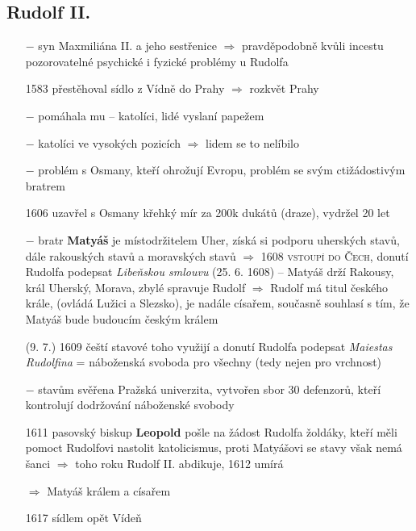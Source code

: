 \documentclass{article}
\begin{document}
\subsection*{Rudolf II.}
\begin{itemize}
    \vspace{-0.5em}
    \setlength\itemsep{0.15em}
    \item[$-$] syn Maxmiliána II. a jeho sestřenice $\Rightarrow$ pravděpodobně kvůli incestu pozorovatelné psychické i fyzické problémy u Rudolfa
    \item[1583] přestěhoval sídlo z Vídně do Prahy $\Rightarrow$ rozkvět Prahy
    \item[$-$] pomáhala mu  -- katolíci, lidé vyslaní papežem
    \item[$-$] katolíci ve vysokých pozicích $\Rightarrow$ lidem se to nelíbilo


    \item[$-$] problém s Osmany, kteří ohrožují Evropu, problém se svým ctižádostivým bratrem
    \item[1606] uzavřel s Osmany křehký mír za 200k dukátů (draze), vydržel 20 let
    \item[$-$] bratr \textbf{Matyáš} je místodržitelem Uher, získá si podporu uherských stavů, dále rakouských stavů a moravských stavů $\Rightarrow$ 1608 \textsc{vstoupí do Čech}, donutí Rudolfa podepsat \textit{Libeňskou smlouvu} (25. 6. 1608) -- Matyáš drží Rakousy, král Uherský, Morava, zbylé spravuje Rudolf $\Rightarrow$ Rudolf má titul českého krále, (ovládá Lužici a Slezsko), je nadále císařem, současně souhlasí s tím, že Matyáš bude budoucím českým králem

    \item[(9. 7.) 1609] čeští stavové toho využijí a donutí Rudolfa podepsat \textit{Maiestas Rudolfina} = náboženská svoboda pro všechny (tedy nejen pro vrchnost)
    \item[$-$] stavům svěřena Pražská univerzita, vytvořen sbor 30 defenzorů, kteří kontrolují dodržování náboženské svobody

    \item[1611] pasovský biskup \textbf{Leopold} pošle na žádost Rudolfa žoldáky, kteří měli pomoct Rudolfovi nastolit katolicismus, proti Matyášovi se stavy však nemá šanci $\Rightarrow$ toho roku Rudolf II. abdikuje, 1612 umírá
    \item[$\Rightarrow$]  Matyáš králem a císařem
    \item[1617]  sídlem opět Vídeň


\end{itemize}
\end{document}
